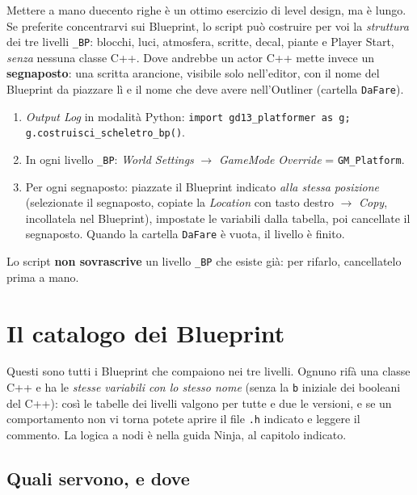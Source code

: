 \documentclass[a4paper,10pt]{article}
\newcommand{\var}[1]{\texttt{#1}}
\begin{document}
Mettere a mano duecento righe è un ottimo esercizio di level design, ma è lungo. Se preferite concentrarvi sui Blueprint, lo script può costruire per voi la \emph{struttura} dei tre livelli \var{\_BP}: blocchi, luci, atmosfera, scritte, decal, piante e Player Start, \emph{senza} nessuna classe C++. Dove andrebbe un actor C++ mette invece un \textbf{segnaposto}: una scritta arancione, visibile solo nell'editor, con il nome del Blueprint da piazzare lì e il nome che deve avere nell'Outliner (cartella \texttt{DaFare}).

\begin{enumerate}
  \item \emph{Output Log} in modalità Python: \texttt{import gd13\_platformer as g; g.costruisci\_scheletro\_bp()}.
  \item In ogni livello \var{\_BP}: \emph{World Settings} $\rightarrow$ \emph{GameMode Override} = \var{GM\_Platform}.
  \item Per ogni segnaposto: piazzate il Blueprint indicato \emph{alla stessa posizione} (selezionate il segnaposto, copiate la \emph{Location} con tasto destro $\rightarrow$ \emph{Copy}, incollatela nel Blueprint), impostate le variabili dalla tabella, poi cancellate il segnaposto. Quando la cartella \texttt{DaFare} è vuota, il livello è finito.
\end{enumerate}

Lo script \textbf{non sovrascrive} un livello \var{\_BP} che esiste già: per rifarlo, cancellatelo prima a mano.

\section{Il catalogo dei Blueprint}\label{sec:catalogo}

Questi sono tutti i Blueprint che compaiono nei tre livelli. Ognuno rifà una classe C++ e ha le \emph{stesse variabili con lo stesso nome} (senza la \var{b} iniziale dei booleani del C++): così le tabelle dei livelli valgono per tutte e due le versioni, e se un comportamento non vi torna potete aprire il file \texttt{.h} indicato e leggere il commento. La logica a nodi è nella guida Ninja, al capitolo indicato.

\subsection*{Quali servono, e dove}
\end{document}
